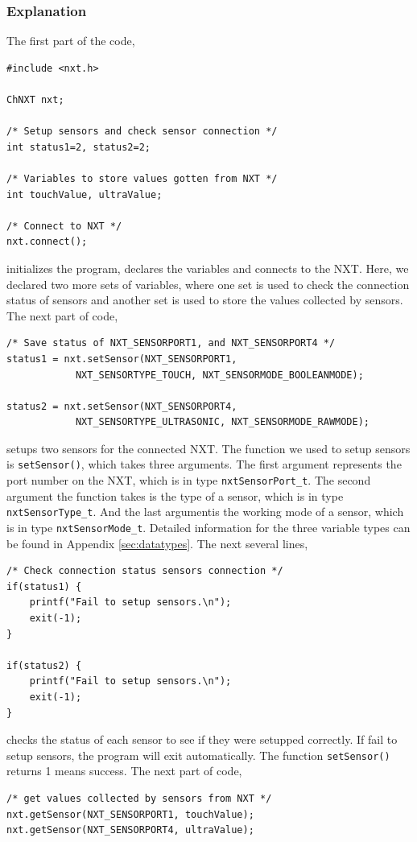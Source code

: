 \documentclass[11pt]{article}
\begin{document}
\subsubsection*{Explanation}
The first part of the code,
\begin{verbatim}
#include <nxt.h>

ChNXT nxt;

/* Setup sensors and check sensor connection */
int status1=2, status2=2;

/* Variables to store values gotten from NXT */
int touchValue, ultraValue;

/* Connect to NXT */
nxt.connect();
\end{verbatim}
initializes the program, declares the variables and connects to the NXT. Here, we declared two more sets of variables, 
where one set is used to check the connection status of sensors and another set is used to store the values collected 
by sensors. The next part of code,
\begin{verbatim}
/* Save status of NXT_SENSORPORT1, and NXT_SENSORPORT4 */
status1 = nxt.setSensor(NXT_SENSORPORT1, 
            NXT_SENSORTYPE_TOUCH, NXT_SENSORMODE_BOOLEANMODE);

status2 = nxt.setSensor(NXT_SENSORPORT4,
            NXT_SENSORTYPE_ULTRASONIC, NXT_SENSORMODE_RAWMODE);
\end{verbatim}
\noindent
setups two sensors for the connected NXT. The function we used to setup sensors is \texttt{setSensor()}, 
which takes three arguments. The first argument represents the port number on the NXT, 
which is in type \texttt{nxtSensorPort\_t}. The second argument the function takes is the type of a sensor,
which is in type \texttt{nxtSensorType\_t}. And the last argumentis the working mode of a sensor, 
which is in type \texttt{nxtSensorMode\_t}. Detailed information for the three variable types can be found 
in Appendix \ref{sec:datatypes}. The next several lines,
\begin{verbatim}
/* Check connection status sensors connection */
if(status1) {
    printf("Fail to setup sensors.\n");
    exit(-1);
}

if(status2) {
    printf("Fail to setup sensors.\n");
    exit(-1);
}
\end{verbatim}
checks the status of each sensor to see if they were setupped correctly. If fail to setup sensors, 
the program will exit automatically. The function \texttt{setSensor()} returns 1 means success. The next part of code,
\begin{verbatim}
/* get values collected by sensors from NXT */
nxt.getSensor(NXT_SENSORPORT1, touchValue);
nxt.getSensor(NXT_SENSORPORT4, ultraValue);
\end{verbatim}
\end{document}
